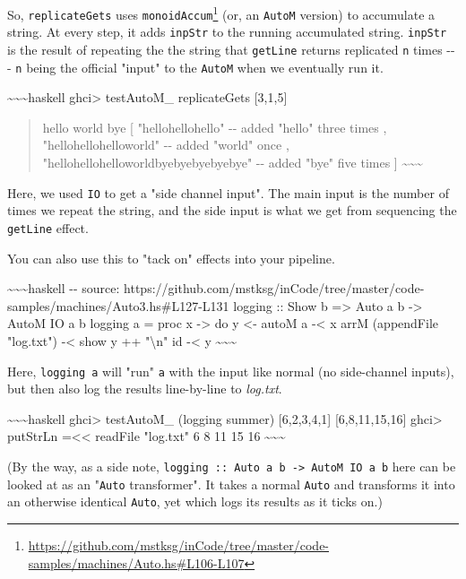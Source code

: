 \documentclass[]{article}
\renewcommand{\href}[2]{#2\footnote{\url{#1}}}
\begin{document}
So, \texttt{replicateGets} uses
\href{https://github.com/mstksg/inCode/tree/master/code-samples/machines/Auto.hs\#L106-L107}{\texttt{monoidAccum}}
(or, an \texttt{AutoM} version) to accumulate a string. At every step, it adds
\texttt{inpStr} to the running accumulated string. \texttt{inpStr} is the result
of repeating the the string that \texttt{getLine} returns replicated \texttt{n}
times -\/-\/- \texttt{n} being the official "input" to the \texttt{AutoM} when
we eventually run it.

\textasciitilde{}\textasciitilde{}\textasciitilde{}haskell ghci\textgreater{}
testAutoM\_ replicateGets {[}3,1,5{]}

\begin{quote}
hello world bye {[} "hellohellohello" -\/- added "hello" three times ,
"hellohellohelloworld" -\/- added "world" once ,
"hellohellohelloworldbyebyebyebyebye" -\/- added "bye" five times {]}
\textasciitilde{}\textasciitilde{}\textasciitilde{}
\end{quote}

Here, we used \texttt{IO} to get a "side channel input". The main input is the
number of times we repeat the string, and the side input is what we get from
sequencing the \texttt{getLine} effect.

You can also use this to "tack on" effects into your pipeline.

\textasciitilde{}\textasciitilde{}\textasciitilde{}haskell -\/- source:
https://github.com/mstksg/inCode/tree/master/code-samples/machines/Auto3.hs\#L127-L131
logging :: Show b =\textgreater{} Auto a b -\textgreater{} AutoM IO a b logging
a = proc x -\textgreater{} do y \textless{}- autoM a -\textless{} x arrM
(appendFile "log.txt") -\textless{} show y ++ "\textbackslash{}n" id
-\textless{} y \textasciitilde{}\textasciitilde{}\textasciitilde{}

Here, \texttt{logging\ a} will "run" \texttt{a} with the input like normal (no
side-channel inputs), but then also log the results line-by-line to
\emph{log.txt}.

\textasciitilde{}\textasciitilde{}\textasciitilde{}haskell ghci\textgreater{}
testAutoM\_ (logging summer) {[}6,2,3,4,1{]} {[}6,8,11,15,16{]}
ghci\textgreater{} putStrLn =\textless{}\textless{} readFile "log.txt" 6 8 11 15
16 \textasciitilde{}\textasciitilde{}\textasciitilde{}

(By the way, as a side note,
\texttt{logging\ ::\ Auto\ a\ b\ -\textgreater{}\ AutoM\ IO\ a\ b} here can be
looked at as an "\texttt{Auto} transformer". It takes a normal \texttt{Auto} and
transforms it into an otherwise identical \texttt{Auto}, yet which logs its
results as it ticks on.)
\end{document}
